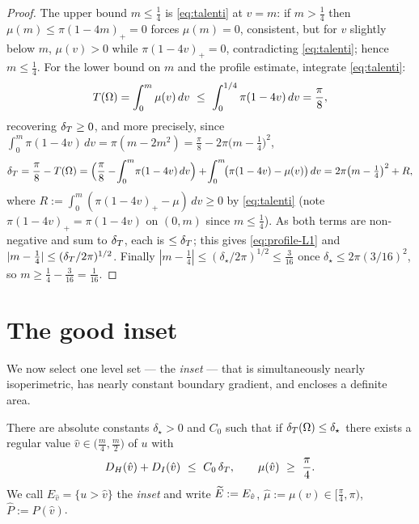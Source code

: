\begin{proof}
The upper bound $m\le\frac14$ is \eqref{eq:talenti} at $v=m$: if $m>\frac14$
then $\mu(m)\le\pi(1-4m)_+=0$ forces $\mu(m)=0$, consistent, but for
$v$ slightly below $m$, $\mu(v)>0$ while $\pi(1-4v)_+=0$, contradicting
\eqref{eq:talenti}; hence $m\le\frac14$. For the lower bound on $m$ and the
profile estimate, integrate \eqref{eq:talenti}:
\[
   T(\Om)=\int_0^m\mu(v)\,dv\ \le\ \int_0^{1/4}\pi(1-4v)\,dv=\frac{\pi}{8},
\]
recovering $\delta_T\ge0$, and more precisely, since
$\int_0^m\pi(1-4v)\,dv=\pi(m-2m^2)=\tfrac{\pi}{8}-2\pi\bigl(m-\tfrac14\bigr)^2$,
\[
   \delta_T=\frac{\pi}{8}-T(\Omega)
   =\Bigl(\frac\pi8-\!\int_0^m\!\pi(1-4v)\,dv\Bigr)
     +\!\int_0^m\!\bigl(\pi(1-4v)-\mu(v)\bigr)\,dv
   =2\pi\bigl(m-\tfrac14\bigr)^2+R,
\]
where $R:=\int_0^m(\pi(1-4v)_+-\mu)\,dv\ge0$ by \eqref{eq:talenti}
(note $\pi(1-4v)_+=\pi(1-4v)$ on $(0,m)$ since $m\le\frac14$). As both
terms are non-negative and sum to $\delta_T$, each is $\le\delta_T$; this gives
\eqref{eq:profile-L1} and $|m-\frac14|\le(\delta_T/2\pi)^{1/2}$. Finally
$|m-\frac14|\le(\delta_\star/2\pi)^{1/2}\le\frac3{16}$ once
$\delta_\star\le 2\pi(3/16)^2$, so $m\ge\frac14-\frac3{16}=\frac1{16}$.
\end{proof}

\section{The good inset}\label{sec:goodlevel}

We now select one level set --- the \emph{inset} --- that is simultaneously
nearly isoperimetric, has nearly constant boundary gradient, and encloses a
definite area.

\begin{proposition}\label{prop:goodlevel}
There are absolute constants $\delta_\star>0$ and $C_0$ such that if
$\delta_T(\Omega)\le\delta_\star$ there exists a regular value
$\hat v\in\bigl(\tfrac{m}{4},\tfrac{m}{2}\bigr)$ of $u$ with
\begin{equation}\label{eq:good}
   D_H(\hat v)+D_I(\hat v)\ \le\ C_0\,\delta_T,
   \qquad
   \mu(\hat v)\ \ge\ \frac\pi4 .
\end{equation}
We call $E_{\hat v}=\{u>\hat v\}$ the \emph{inset} and write
$\widetilde E:=E_{\hat v}$, $\hat\mu:=\mu(\hat v)\in[\tfrac\pi4,\pi)$,
$\hat P:=P(\hat v)$.
\end{proposition}

